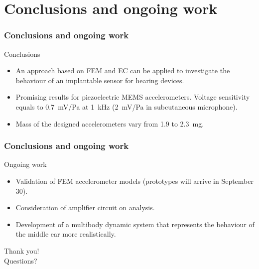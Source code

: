 \documentclass[dvipsnames,12pt]{beamer}
\begin{document}
\section{Conclusions and ongoing work}
\begin{frame}
\frametitle{Conclusions and ongoing work}
\begin{block}{Conclusions}
\begin{itemize}
    \item An approach based on FEM and EC can be applied to investigate the behaviour of an implantable sensor for hearing devices.
    \item Promising results for piezoelectric MEMS accelerometers. Voltage sensitivity equals to 0.7~mV/Pa at 1~kHz (2~mV/Pa in subcutaneous microphone).
    \item Mass of the designed accelerometers vary from 1.9 to 2.3~mg.
\end{itemize}
\end{block}
\end{frame}


\begin{frame}
\frametitle{Conclusions and ongoing work}
\begin{block}{Ongoing work}
\begin{itemize}
    \item Validation of FEM accelerometer models (prototypes will arrive in September 30).
    \item Consideration of amplifier circuit on analysis.
    \item Development of a multibody dynamic system that represents the behaviour of the middle ear more realistically.
\end{itemize}
\end{block}
\end{frame}
\begin{frame}
 
\begin{center}
Thank you!\\[2cm]Questions?
\end{center}
\end{frame}
\end{document}
